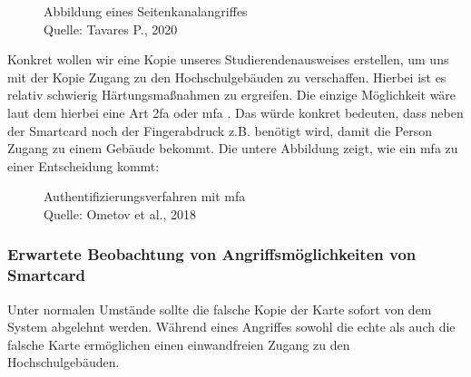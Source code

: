 \begin{figure}[H]
  \caption{Abbildung eines Seitenkanalangriffes\\ Quelle: Tavares P., 2020}
  \label{fig:refart_scpt}
\end{figure}


Konkret wollen wir eine Kopie unseres Studierendenausweises erstellen, um uns mit der Kopie Zugang zu den Hochschulgebäuden 
zu verschaffen. Hierbei ist es relativ schwierig Härtungsmaßnahmen zu ergreifen. Die einzige Möglichkeit wäre laut dem
 hierbei eine Art \acrshort{2fa} oder \acrshort{mfa} \cite{refst:2fa}. Das würde konkret bedeuten, dass
neben der Smartcard noch der Fingerabdruck z.B. benötigt wird, damit die Person Zugang zu einem Gebäude bekommt. Die untere
Abbildung zeigt, wie ein \acrshort{mfa} zu einer Entscheidung kommt:


\begin{figure}[H]
  \caption{Authentifizierungsverfahren mit \acrshort{mfa} \\ Quelle: Ometov et al., 2018}
  \label{fig:refart_AOMF}
\end{figure}


\subsubsection{Erwartete Beobachtung von Angriffsmöglichkeiten von Smartcard}
Unter normalen Umstände sollte die falsche Kopie der Karte sofort von dem System abgelehnt werden. Während eines Angriffes
sowohl die echte als auch die falsche Karte ermöglichen einen einwandfreien Zugang zu den Hochschulgebäuden.


